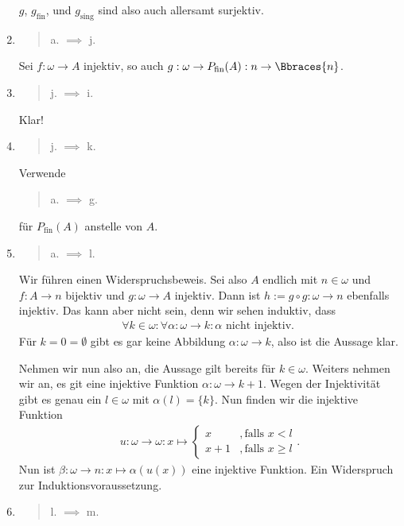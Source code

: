 \begin{solution}
\begin{enumerate}[label = \texttt{ad}]
	$g$, $g_\mathrm{fin}$, und $g_\mathrm{sing}$ sind also auch allersamt surjektiv.
	
	\item \blockquote{a. $\implies$ j.}:
	
	Sei $f: \omega \to A$ injektiv, so auch $g: \omega \to P_\mathrm{fin}(A): n \to \Bbraces{n}$.
	
	\item \blockquote{j. $\implies$ i.}:
	
	Klar!
	
	\item \blockquote{j. $\implies$ k.}:
	
	Verwende \blockquote{a. $\implies$ g.} für $P_\mathrm{fin}(A)$ anstelle von $A$.
	
	\item \blockquote{a. $\implies$ l.}:
	
	Wir führen einen Widerspruchsbeweis. Sei also $A$ endlich mit $n \in \omega$ und $f: A \to n$ bijektiv und $g: \omega \to A$ injektiv. Dann ist $h:= g \circ g: \omega \to n$ ebenfalls injektiv. Das kann aber nicht sein, denn wir sehen induktiv, dass
	\begin{align*}
		\forall k \in \omega: \forall \alpha: \omega \to k: \alpha \text{ nicht injektiv. }
	\end{align*}
	Für $k = 0 = \emptyset$ gibt es gar keine Abbildung $\alpha: \omega \to k$, also ist die Aussage klar.
	
	Nehmen wir nun also an, die Aussage gilt bereits für $k \in \omega$. Weiters nehmen wir an, es git eine injektive Funktion $\alpha: \omega \to k + 1$. Wegen der Injektivität gibt es genau ein $l \in \omega$ mit $\alpha(l) = \{k\}$. Nun finden wir die injektive Funktion 
	\begin{align*}
		u: \omega \to \omega: x \mapsto
		\begin{cases}
			x &, \text{falls } x < l \\
			x + 1 &, \text{falls } x \geq l
		\end{cases}.
	\end{align*}
	Nun ist $\beta: \omega \to n: x \mapsto \alpha(u(x))$ eine injektive Funktion. Ein Widerspruch zur Induktionsvoraussetzung. 
	
	\item \blockquote{l. $\implies$ m.}:
	

\end{enumerate}
\end{solution}
